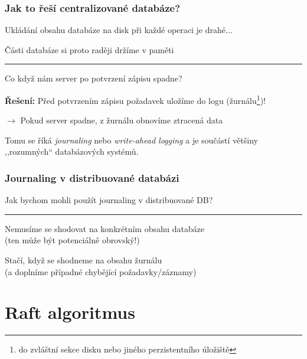 \documentclass[usenames,dvipsnames,9pt]{beamer}
\begin{document}
\begin{frame}
  \frametitle{Jak to řeší centralizované databáze?}

  {\large Ukládání obsahu databáze na disk při každé operaci je drahé...}

  \hfill {\large \faWarning \hspace{3pt} Části databáze si proto raději držíme v paměti}

  \pause\vspace{3em}\hrule\vspace{0.2em}
  \begin{center}
    \LARGE Co když nám server po potvrzení zápisu spadne?
  \end{center}

  \vspace{1em}\pause
  {\large
    \textbf{Řešení:} Před potvrzením zápisu požadavek uložíme do logu (žurnálu\footnote{do zvláštní sekce disku nebo jiného perzistentního úložiště})!

    \hspace{20pt} $\rightarrow$ Pokud server spadne, z žurnálu obnovíme ztracená data

    \vspace{1em}

    Tomu se říká \emph{journaling} nebo \emph{write-ahead logging} a je součástí většiny ,,rozumných`` databázových systémů.
  }
\end{frame}

\begin{frame}
  \frametitle{Journaling v distribuované databázi}
  \begin{center}
    \LARGE Jak bychom mohli použít journaling v distribuované DB?
  \end{center}

  \pause
  \vspace{2em}\hrule\vspace{2em}

  {\Large Nemusíme se shodovat na konkrétním obsahu databáze} \\
  (ten může být potenciálně obrovský!)

  \vspace{1em}

  {\Large Stačí, když se shodneme na obsahu žurnálu} \\
  (a doplníme případné chybějící požadavky/záznamy)
\end{frame}

\section{Raft algoritmus}
\end{document}
